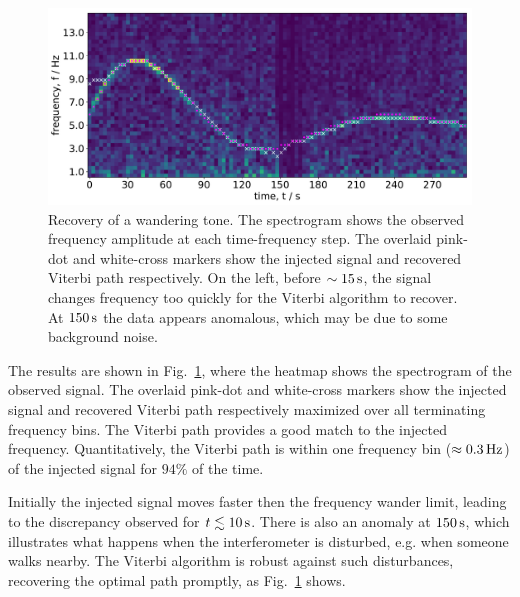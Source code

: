 \documentclass[paper-main.tex]{subfiles}
\begin{document}
\begin{figure}
	\includegraphics[width=\textwidth]{figures/expt_overlay_2_viterbi_test_webcam.pdf}
	\caption{\label{fig:viterbi_overlay}
Recovery of a wandering tone. 
The spectrogram shows the observed frequency amplitude at each time-frequency step. 
The overlaid pink-dot and white-cross markers show the injected signal and recovered Viterbi path respectively. 
On the left, before $\sim 15\,{\rm s}$, the signal changes frequency too quickly for the Viterbi algorithm to recover. 
At $150\,{\rm s}$ the data appears anomalous, which may be due to some background noise. }
\end{figure}


The results are shown in Fig.~\ref{fig:viterbi_overlay}, where the heatmap shows the spectrogram of the observed signal. 
The overlaid pink-dot and white-cross markers show the injected signal and recovered Viterbi path respectively maximized over all terminating frequency bins. 
The Viterbi path provides a good match to the injected frequency. 
Quantitatively, the Viterbi path is within one frequency bin ($\approx 0.3\,{\rm Hz}$) of the injected signal for $94\%$ of the time. 

Initially the injected signal moves faster then the frequency wander limit, leading to the discrepancy observed for $t\lesssim 10\,{\rm s}$. 
There is also an anomaly at $150\,{\rm s}$, which illustrates what happens when the interferometer is disturbed, e.g. when someone walks nearby. 
The Viterbi algorithm is robust against such disturbances, recovering the optimal path promptly, as Fig.~\ref{fig:viterbi_overlay} shows. 
\end{document}
